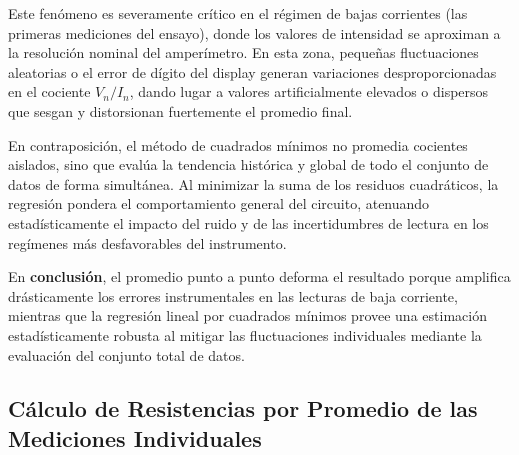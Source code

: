 Este fenómeno es severamente crítico en el régimen de bajas corrientes (las primeras mediciones del ensayo), donde los valores de intensidad se aproximan a la resolución nominal del amperímetro. En esta zona, pequeñas fluctuaciones aleatorias o el error de dígito del display generan variaciones desproporcionadas en el cociente $V_n / I_n$, dando lugar a valores artificialmente elevados o dispersos que sesgan y distorsionan fuertemente el promedio final. 

En contraposición, el método de cuadrados mínimos no promedia cocientes aislados, sino que evalúa la tendencia histórica y global de todo el conjunto de datos de forma simultánea. Al minimizar la suma de los residuos cuadráticos, la regresión pondera el comportamiento general del circuito, atenuando estadísticamente el impacto del ruido y de las incertidumbres de lectura en los regímenes más desfavorables del instrumento.


En \textbf{conclusión}, el promedio punto a punto deforma el resultado porque amplifica drásticamente los errores instrumentales en las lecturas de baja corriente, mientras que la regresión lineal por cuadrados mínimos provee una estimación estadísticamente robusta al mitigar las fluctuaciones individuales mediante la evaluación del conjunto total de datos.

\clearpage
\subsection{Cálculo de Resistencias por Promedio de las Mediciones Individuales}
\label{subsec:calculo-de-resistencias-por-promedio-de-las-mediciones-individuales}

\begin{table}[H]
    \centering
    \caption{Resistencia en cada punto de la primera medición}
    \label{tab:resistencia_promedio_1}
\end{table}

